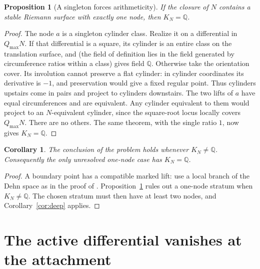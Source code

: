 \documentclass[11pt]{article}
\newtheorem{proposition}[theorem]{Proposition}
\newtheorem{corollary}[theorem]{Corollary}
\theoremstyle{remark}
\begin{document}
\begin{proposition}[A singleton forces arithmeticity]\label{prop:field}
If the closure of \(N\) contains a stable Riemann surface with
exactly one node, then \(K_N=\mathbb Q\).
\end{proposition}
\begin{proof}
The node \(a\) is a singleton cylinder class. Realize it
on a differential in \(Q_{\max}N\).
If that differential is a square, its cylinder is an entire
class on the translation surface, and
\cite[Theorem 7.1]{WrightCylinder} (the field of definition lies in
the field generated by circumference ratios within a class) gives
field \(\mathbb Q\).
Otherwise take the orientation cover. Its involution cannot
preserve a flat cylinder: in cylinder coordinates its
derivative is \(-1\), and preservation would give a fixed
regular point. Thus cylinders upstairs come in pairs and
project to cylinders downstairs. The two lifts of \(a\)
have equal circumferences and are equivalent. Any cylinder
equivalent to them would project to an \(N\)-equivalent
cylinder, since the square-root locus locally covers
\(Q_{\max}N\). There are no others. The same theorem, with the
single ratio \(1\), now gives \(K_N=\mathbb Q\).
\end{proof}

\begin{corollary}\label{cor:nonarithmetic}
The conclusion of the problem holds whenever \(K_N\ne\mathbb Q\).
Consequently the only unresolved one-node case has \(K_N=\mathbb Q\).
\end{corollary}
\begin{proof}
A boundary point has a compatible marked lift: use a local branch
of the Dehn space as in the proof of \cite[Lemma 3.13]{AHW}.
Proposition~\ref{prop:field} rules out a one-node stratum when
\(K_N\ne\mathbb Q\). The chosen stratum must then have at least
two nodes, and Corollary~\ref{cor:deep} applies.
\end{proof}

\section{The active differential vanishes at the attachment}\label{sec:sewing}
\end{document}
